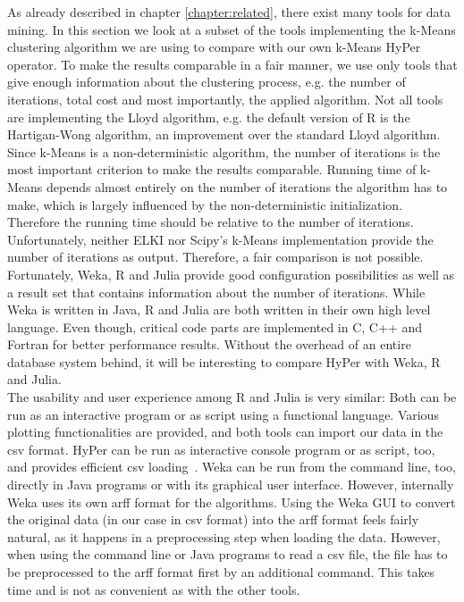 As already described in chapter \ref{chapter:related}, there exist many tools for data mining. In this section we look at a subset of the tools implementing the k-Means clustering algorithm we are using to compare with our own k-Means HyPer operator. To make the results comparable in a fair manner, we use only tools that give enough information about the clustering process, e.g. the number of iterations, total cost and most importantly, the applied algorithm. Not all tools are implementing the Lloyd algorithm, e.g. the default version of R is the Hartigan-Wong algorithm, an improvement over the standard Lloyd algorithm.
\\
Since k-Means is a non-deterministic algorithm, the number of iterations is the most important criterion to make the results comparable. Running time of k-Means depends almost entirely on the number of iterations the algorithm has to make, which is largely influenced by the non-deterministic initialization. Therefore the running time should be relative to the number of iterations.
\\
Unfortunately, neither ELKI nor Scipy’s k-Means implementation provide the number of iterations as output. Therefore, a fair comparison is not possible. Fortunately, Weka, R and Julia provide good configuration possibilities as well as a result set that contains information about the number of iterations. While Weka is written in Java, R and Julia are both written in their own high level language. Even though, critical code parts are implemented in C, C++ and Fortran for better performance results. Without the overhead of an entire database system behind, it will be interesting to compare HyPer with Weka, R and Julia.
\\
The usability and user experience among R and Julia is very similar: Both can be run as an interactive program or as script using a functional language. Various plotting functionalities are provided, and both tools can import our data in the csv format. HyPer can be run as interactive console program or as script, too, and provides efficient csv loading~\parencite{hypercsv}. Weka can be run from the command line, too, directly in Java programs or with its graphical user interface. However, internally Weka uses its own arff format for the algorithms. Using the Weka GUI to convert the original data (in our case in csv format) into the arff format feels fairly natural, as it happens in a preprocessing step when loading the data. However, when using the command line or Java programs to read a csv file, the file has to be preprocessed to the arff format first by an additional command. This takes time and is not as convenient as with the other tools.
